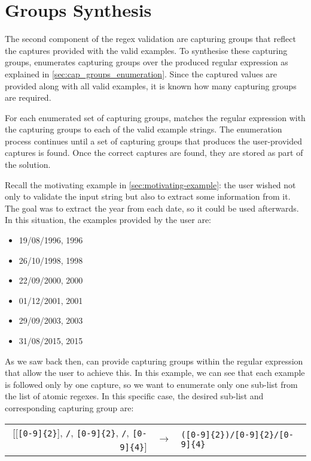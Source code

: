 \section{Groups Synthesis}\label{sec:cap_groups_synthesis}
The second component of the regex validation are capturing groups that reflect the captures provided with the valid examples. To synthesise these capturing groups, \Forest enumerates capturing groups over the produced regular expression as explained in \autoref{sec:cap_groups_enumeration}. Since the captured values are provided along with all valid examples, it is known how many capturing groups are required.

For each enumerated set of capturing groups, \Forest matches the regular expression with the capturing groups to each of the valid example strings. The enumeration process continues until a set of capturing groups that produces the user-provided captures is found. Once the correct captures are found, they are stored as part of the solution.

\begin{example}
Recall the motivating example in \autoref{sec:motivating-example}: the user wished not only to validate the input string but also to extract some information from it. The goal was to extract the year from each date, so it could be used afterwards. In this situation, the examples provided by the user are:
%
\begin{multicols}{3}
    \begin{itemize}[label={}]
    \item 19/08/1996, 1996
    \item 26/10/1998, 1998
    \item 22/09/2000, 2000
    \item 01/12/2001, 2001
    \item 29/09/2003, 2003
    \item 31/08/2015, 2015
    \end{itemize}
\end{multicols}
%
As we saw back then, \Forest can provide capturing groups within the regular expression that allow the user to achieve this. In this example, we can see that each example is followed only by one capture, so we want to enumerate only one sub-list from the list of atomic regexes. In this specific case, the desired sub-list and corresponding capturing group are:
%
\begin{center}
\begin{tabular}{rcl}
[[\verb![0-9]{2}!], \verb!/!, \verb![0-9]{2}!, \verb!/!, \verb![0-9]{4}!] & $\rightarrow$ & \verb!([0-9]{2})/[0-9]{2}/[0-9]{4}!
\end{tabular}\bigskip
\end{center}
\end{example}


